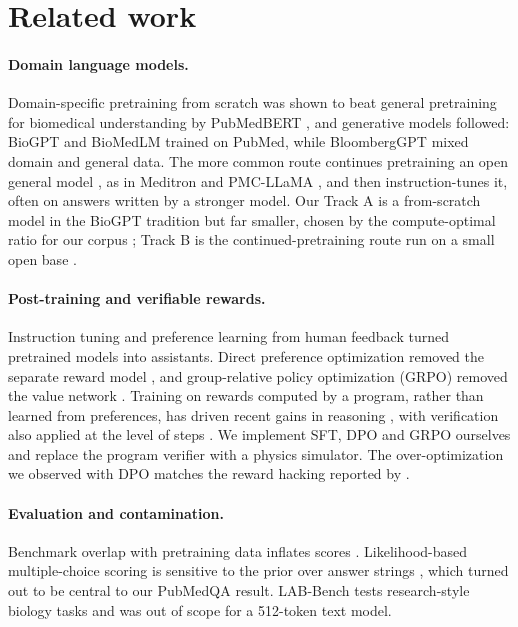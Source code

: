 \documentclass[11pt]{article}
\begin{document}
\section{Related work}

\paragraph{Domain language models.} Domain-specific pretraining from
scratch was shown to beat general pretraining for biomedical understanding
by PubMedBERT \citep{gu2021domain}, and generative models followed:
BioGPT \citep{luo2022biogpt} and BioMedLM \citep{bolton2024biomedlm}
trained on PubMed, while BloombergGPT \citep{wu2023bloomberggpt} mixed domain and
general data. The more common route continues
pretraining an open general model \citep{gururangan2020dont}, as in
Meditron \citep{chen2023meditron} and PMC-LLaMA \citep{wu2024pmcllama}, and
then instruction-tunes it, often on answers written by a stronger model.
Our Track A is a from-scratch model in the BioGPT tradition but far
smaller, chosen by the compute-optimal ratio for our corpus
\citep{hoffmann2022training}; Track B is the continued-pretraining route
run on a small open base \citep{allal2025smollm2}.

\paragraph{Post-training and verifiable rewards.} Instruction tuning
\citep{wei2022finetuned} and preference learning from human feedback
\citep{ouyang2022training} turned pretrained models into assistants. Direct
preference optimization removed the separate reward model
\citep{rafailov2023direct}, and group-relative policy optimization (GRPO)
removed the value network \citep{shao2024deepseekmath}. Training on rewards
computed by a program, rather than learned from preferences, has driven
recent gains in reasoning \citep{lambert2024tulu,deepseek2025r1}, with
verification also applied at the level of steps \citep{lightman2023verify}. We
implement SFT, DPO and GRPO ourselves and replace the program verifier with
a physics simulator. The over-optimization we observed with DPO matches the
reward hacking reported by \citet{gao2023scaling}.

\paragraph{Evaluation and contamination.} Benchmark overlap with
pretraining data inflates scores \citep{magar2022data,sainz2023nlp}.
Likelihood-based multiple-choice scoring is sensitive to the prior over
answer strings \citep{zhao2021calibrate,holtzman2021surface}, which turned
out to be central to our PubMedQA result. LAB-Bench \citep{laurent2024labbench}
tests research-style biology tasks and was out of scope for a
512-token text model.
\end{document}
